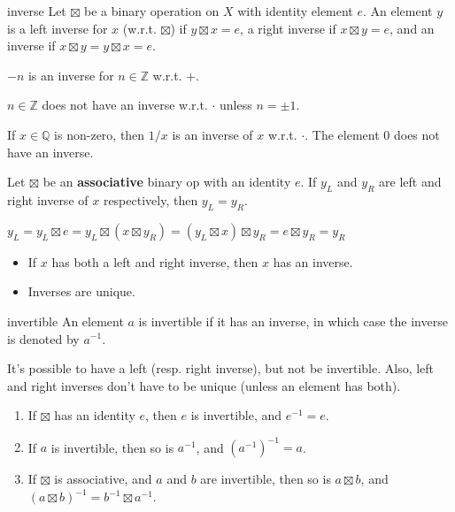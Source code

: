 \begin{defn}{inverse}
Let $\boxtimes$ be a binary operation on $X$ with identity element $e$. An element $y$ is a left inverse for $x$ (w.r.t. $\boxtimes$) if $y\boxtimes x=e$, a right inverse if $x\boxtimes y=e$, and an inverse if $x\boxtimes y = y\boxtimes x=e$.
\end{defn}

\begin{ex}
$-n$ is an inverse for $n\in \mathbb Z$ w.r.t. $+$.

$n\in\mathbb Z$ does not have an inverse w.r.t. $\cdot$ unless $n=\pm 1$.

If $x\in \mathbb Q$ is non-zero, then $1/x$ is an inverse of $x$ w.r.t. $\cdot$. The element $0$ does not have an inverse.
\end{ex}

\begin{lemma}
Let $\boxtimes$ be an \textbf{associative} binary op with an identity $e$. If $y_L$ and $y_R$ are left and right inverse of $x$ respectively, then $y_L=y_R$.
\end{lemma}

\begin{pf}
$y_L=y_L\boxtimes e = y_L \boxtimes (x\boxtimes y_R) = (y_L \boxtimes x) \boxtimes y_R = e\boxtimes y_R = y_R$
\end{pf}

\begin{corr}
	\begin{itemize}
	\item If $x$ has both a left and right inverse, then $x$ has an inverse.
	\item Inverses are unique.
	\end{itemize}
\end{corr}

\begin{defn}{invertible}
An element $a$ is invertible if it has an inverse, in which case the inverse is denoted by $a^{-1}$.
\end{defn}

\begin{exercise}
It's possible to have a left (resp. right inverse), but not be invertible. Also, left and right inverses don't have to be unique (unless an element has both).
\end{exercise}

\begin{lemma}
\begin{enumerate}
\item If $\boxtimes$ has an identity $e$, then $e$ is invertible, and $e^{-1}=e$.
\item If $a$ is invertible, then so is $a^{-1}$, and ${\left(a^{-1}\right)}^{-1}=a$.
\item If $\boxtimes$ is associative, and $a$ and $b$ are invertible, then so is $a\boxtimes b$, and $(a\boxtimes b)^{-1}=b^{-1}\boxtimes a^{-1}$.
\end{enumerate}
\end{lemma}

